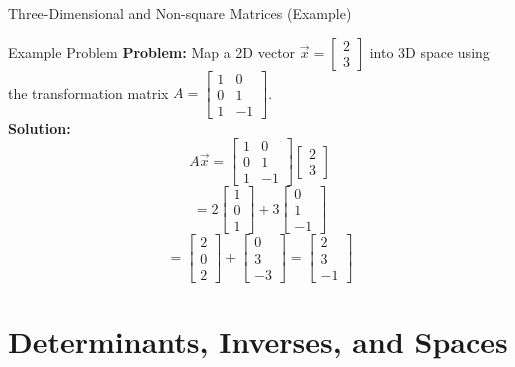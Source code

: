 \documentclass[10pt, aspectratio=169]{beamer}
\begin{document}
\begin{frame}{Three-Dimensional and Non-square Matrices (Example)}
    \begin{exampleblock}{Example Problem}
        \textbf{Problem:} Map a 2D vector $\vec{x} = \begin{bmatrix} 2 \\ 3 \end{bmatrix}$ into 3D space using the transformation matrix $A = \begin{bmatrix} 1 & 0 \\ 0 & 1 \\ 1 & -1 \end{bmatrix}$. \\
        \vspace{0.5cm}
        \textbf{Solution:}
        $$A\vec{x} = \begin{bmatrix} 1 & 0 \\ 0 & 1 \\ 1 & -1 \end{bmatrix} \begin{bmatrix} 2 \\ 3 \end{bmatrix}$$
        $$= 2\begin{bmatrix} 1 \\ 0 \\ 1 \end{bmatrix} + 3\begin{bmatrix} 0 \\ 1 \\ -1 \end{bmatrix}$$
        $$= \begin{bmatrix} 2 \\ 0 \\ 2 \end{bmatrix} + \begin{bmatrix} 0 \\ 3 \\ -3 \end{bmatrix} = \begin{bmatrix} 2 \\ 3 \\ -1 \end{bmatrix}$$
    \end{exampleblock}
\end{frame}

\section{Determinants, Inverses, and Spaces}
\end{document}
